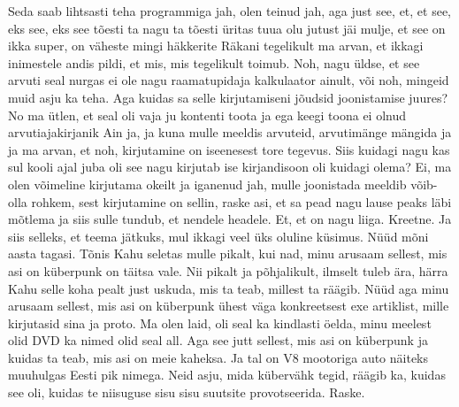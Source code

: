 Seda saab lihtsasti teha programmiga jah, olen teinud jah, aga just see, et, et see, eks see, eks see tõesti ta nagu ta tõesti üritas tuua olu jutust jäi mulje, et see on ikka super, on väheste mingi häkkerite Räkani tegelikult ma arvan, et ikkagi inimestele andis pildi, et mis, mis tegelikult toimub. Noh, nagu üldse, et see arvuti seal nurgas ei ole nagu raamatupidaja kalkulaator ainult, või noh, mingeid muid asju ka teha. Aga kuidas sa selle kirjutamiseni jõudsid joonistamise juures? No ma ütlen, et seal oli vaja ju kontenti toota ja ega keegi toona ei olnud arvutiajakirjanik Ain ja, ja kuna mulle meeldis arvuteid, arvutimänge mängida ja ja ma arvan, et noh, kirjutamine on iseenesest tore tegevus. Siis kuidagi nagu kas sul kooli ajal juba oli see nagu kirjutab ise kirjandisoon oli kuidagi olema? Ei, ma olen võimeline kirjutama okeilt ja iganenud jah, mulle joonistada meeldib võib-olla rohkem, sest kirjutamine on sellin, raske asi, et sa pead nagu lause peaks läbi mõtlema ja siis sulle tundub, et nendele headele. Et, et on nagu liiga.
Kreetne.
Ja siis selleks, et teema jätkuks, mul ikkagi veel üks oluline küsimus.
Nüüd mõni aasta tagasi.
Tõnis Kahu seletas mulle pikalt, kui nad, minu arusaam sellest, mis asi on küberpunk on täitsa vale. Nii pikalt ja põhjalikult, ilmselt tuleb ära, härra Kahu selle koha pealt just uskuda, mis ta teab, millest ta räägib. Nüüd aga minu arusaam sellest, mis asi on küberpunk ühest väga konkreetsest exe artiklist, mille kirjutasid sina ja proto. Ma olen laid, oli seal ka kindlasti öelda, minu meelest olid DVD ka nimed olid seal all. Aga see jutt sellest, mis asi on küberpunk ja kuidas ta teab, mis asi on meie kaheksa. Ja tal on V8 mootoriga auto näiteks muuhulgas Eesti pik nimega. Neid asju, mida kübervähk tegid, räägib ka, kuidas see oli, kuidas te niisuguse sisu sisu suutsite provotseerida.
Raske.
